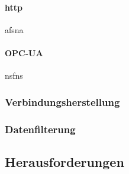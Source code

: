         
           \paragraph{http} 
            afsna

            \paragraph{OPC-UA}
            nsfns

    
    \subsubsection{Verbindungsherstellung}

    \subsubsection{Datenfilterung}

\subsection{Herausforderungen}